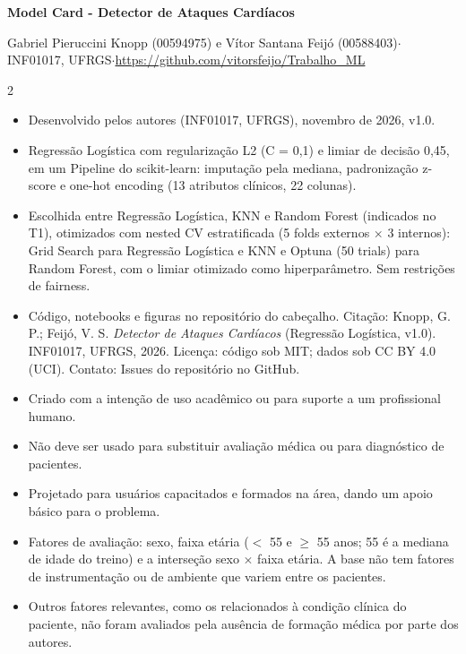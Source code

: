 \documentclass[10pt,a4paper]{article}
\newcommand{\secao}[1]{\par\vspace{5pt}{\normalsize\bfseries #1}\par\vspace{1pt}}
\begin{document}
\small

\begin{center}
{\Large\bfseries Model Card - Detector de Ataques Cardíacos}\par\vspace{2pt}
{\footnotesize Gabriel Pieruccini Knopp (00594975) e Vítor Santana Feijó (00588403)\enspace$\cdot$\enspace
INF01017, UFRGS\enspace$\cdot$\enspace \url{https://github.com/vitorsfeijo/Trabalho_ML}}
\end{center}
\vspace{-4pt}

\begin{paracol}{2}

\secao{Model Details}
\begin{itemize}
\item Desenvolvido pelos autores (INF01017, UFRGS), novembro de 2026, v1.0.
\item Regressão Logística com regularização L2 (C = 0,1) e limiar de decisão 0,45, em um Pipeline do scikit-learn: imputação pela mediana, padronização z-score e one-hot encoding (13 atributos clínicos, 22 colunas).
\item Escolhida entre Regressão Logística, KNN e Random Forest (indicados no T1), otimizados com nested CV estratificada (5 folds externos $\times$ 3 internos): Grid Search para Regressão Logística e KNN e Optuna (50 trials) para Random Forest, com o limiar otimizado como hiperparâmetro. Sem restrições de fairness.
\item Código, notebooks e figuras no repositório do cabeçalho. Citação: Knopp, G. P.; Feijó, V. S. \textit{Detector de Ataques Cardíacos} (Regressão Logística, v1.0). INF01017, UFRGS, 2026. Licença: código sob MIT; dados sob CC BY 4.0 (UCI). Contato: Issues do repositório no GitHub.

\end{itemize}

\secao{Intended Use}
\begin{itemize}
\item Criado com a intenção de uso acadêmico ou para suporte a um profissional humano.
\item Não deve ser usado para substituir avaliação médica ou para diagnóstico de pacientes.
\item Projetado para usuários capacitados e formados na área, dando um apoio básico para o problema. 
\end{itemize}

\secao{Factors}
\begin{itemize}
\item Fatores de avaliação: sexo, faixa etária ($<$ 55 e $\geq$ 55 anos; 55 é a mediana de idade do treino) e a interseção sexo $\times$ faixa etária. A base não tem fatores de instrumentação ou de ambiente que variem entre os pacientes.
\item Outros fatores relevantes, como os relacionados à condição clínica do paciente, não foram avaliados pela ausência de formação médica por parte dos autores.
\end{itemize}


\end{paracol}
\end{document}
